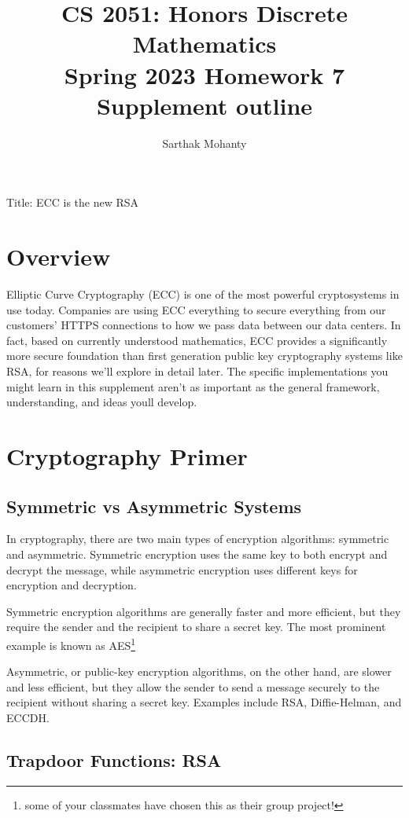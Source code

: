 \documentclass{article}
\title{\vspace{-1cm}CS 2051: Honors Discrete Mathematics \\Spring 2023 Homework 7 Supplement outline}
\author{Sarthak Mohanty }
\date{}
\begin{document}
\maketitle


Title: ECC is the new RSA
\section*{Overview}

Elliptic Curve Cryptography (ECC) is one of the most powerful cryptosystems in use today. Companies are using ECC everything to secure everything from our customers' HTTPS connections to how we pass data between our data centers. In fact, based on currently understood mathematics, ECC provides a significantly more secure foundation than first generation public key cryptography systems like RSA, for reasons we'll explore in detail later. The specific implementations you might learn in this supplement aren't as important as the general framework, understanding, and ideas youll develop.


\section*{Cryptography Primer}


\subsection*{Symmetric vs Asymmetric Systems}

In cryptography, there are two main types of encryption algorithms: symmetric and asymmetric. Symmetric encryption uses the same key to both encrypt and decrypt the message, while asymmetric encryption uses different keys for encryption and decryption.

Symmetric encryption algorithms are generally faster and more efficient, but they require the sender and the recipient to share a secret key. The most prominent example is known as AES\footnote{some of your classmates have chosen this as their group project!} 


Asymmetric, or public-key encryption algorithms, on the other hand, are slower and less efficient, but they allow the sender to send a message securely to the recipient without sharing a secret key. Examples include RSA, Diffie-Helman, and ECCDH.


\subsection*{Trapdoor Functions: RSA}
\end{document}
